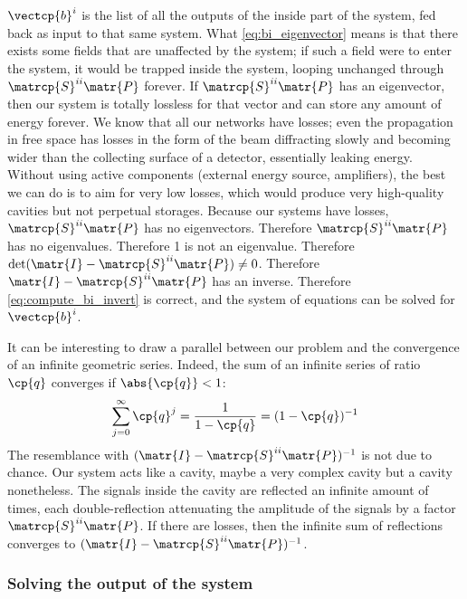 \begin{refsection}
$\vectcp{b}^i$ is the list of all the outputs of the inside part of the system, fed back as input to that same system.
What \cref{eq:bi_eigenvector} means is that there exists some fields that are unaffected by the system; if such a field were to enter the system, it would be trapped inside the system, looping unchanged through $\matrcp{S}^{ii}\matr{P}$ forever.
If $\matrcp{S}^{ii}\matr{P}$ has an eigenvector, then our system is totally lossless for that vector and can store any amount of energy forever.
We know that all our networks have losses; even the propagation in free space has losses in the form of the beam diffracting slowly and becoming wider than the collecting surface of a detector, essentially leaking energy.
Without using active components (external energy source, amplifiers), the best we can do is to aim for very low losses, which would produce very high-quality cavities but not perpetual storages.
Because our systems have losses, $\matrcp{S}^{ii}\matr{P}$ has no eigenvectors.
Therefore $\matrcp{S}^{ii}\matr{P}$ has no eigenvalues.
Therefore 1 is not an eigenvalue.
Therefore $\det(\matr{I}-\matrcp{S}^{ii}\matr{P}) \neq 0$.
Therefore $\matr{I}-\matrcp{S}^{ii}\matr{P}$ has an inverse.
Therefore \cref{eq:compute_bi_invert} is correct, and the system of equations can be solved for~$\vectcp{b}^i$.

It can be interesting to draw a parallel between our problem and the convergence of an infinite geometric series.
Indeed, the sum of an infinite series of ratio $\cp{q}$ converges if $\abs{\cp{q}} < 1$:
\begin{equation}
    \sum_{j=0}^\infty \cp{q}^j = \frac{1}{1-\cp{q}} = (1-\cp{q})^{-1}
\end{equation}
The resemblance with $(\matr{I} - \matrcp{S}^{ii}\matr{P})^{-1}$ is not due to chance.
Our system acts like a cavity, maybe a very complex cavity but a cavity nonetheless.
The signals inside the cavity are reflected an infinite amount of times, each double-reflection attenuating the amplitude of the signals by a factor $\matrcp{S}^{ii}\matr{P}$.
If there are losses, then the infinite sum of reflections converges to $(\matr{I} - \matrcp{S}^{ii}\matr{P})^{-1}$.




\subsubsection{Solving the output of the system}


\end{refsection}
